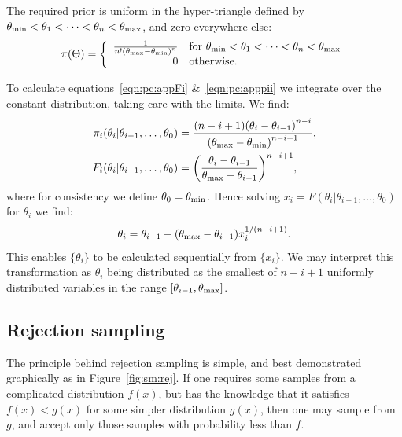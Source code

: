 The required prior is uniform in the hyper-triangle defined by \(\theta_{\mathrm{min}}<\theta_1<\cdots<\theta_n<\theta_{\mathrm{max}}\), and zero everywhere else:
%
\begin{equation}
  \pi(\Theta) = 
  \left\{
    \begin{array}{rl}
      \frac{1}{n!{(\theta_{\mathrm{max}} - \theta_{\mathrm{min}})}^{n}} 
      &
      \text{for }\theta_{\mathrm{min}}<\theta_1<\cdots<\theta_n<\theta_{\mathrm{max}} \\
      0 &\text{otherwise.}
    \end{array}
    \right.
\label{eqn:pc:sorted_uniform_prior}
\end{equation}

To calculate equations~\eqref{eqn:pc:appFi} \&~\eqref{eqn:pc:apppii} we integrate over the constant distribution, taking care with the limits. We find:
\begin{align}
  \pi_i(\theta_i|\theta_{i-1},\ldots,\theta_0) &= \frac{(n-i+1){(\theta_i-\theta_{i-1})}^{n-i}}{{(\theta_{\mathrm{max}}-\theta_{\mathrm{min}})}^{n-i+1}},\\
  F_i(\theta_i|\theta_{i-1},\ldots,\theta_0) &= {\left(\frac{\theta_i-\theta_{i-1}}{\theta_{\mathrm{max}}-\theta_{i-1}}\right)}^{n-i+1},
  \label{eqn:pc:sorted_uniform_calc}
\end{align}
where for consistency we define \(\theta_0 = \theta_{\mathrm{min}}\). Hence solving \(x_i=F(\theta_i|\theta_{i-1},\ldots,\theta_0)\) for \(\theta_i\) we find:
\begin{equation}
  \theta_i = \theta_{i-1}+ (\theta_{\mathrm{max}}-\theta_{i-1})x_i^{1/(n-i+1)}.
  \label{eqn:pc:sorted_uniform_trans}
\end{equation}
This enables \(\{\theta_i\}\) to be calculated sequentially from \(\{x_i\}\). We may interpret this transformation as \(\theta_i\) being distributed as the smallest of \(n-i+1\) uniformly distributed variables in the range \([\theta_{i-1},\theta_{\mathrm{max}}]\).



\subsection{Rejection sampling}
\label{sec:sm:rejection}

The principle behind rejection sampling is simple, and best demonstrated graphically as in Figure~\ref{fig:sm:rej}. If one requires some samples from a complicated distribution \(f(x)\), but has the knowledge that it satisfies \(f(x)<g(x)\) for some simpler distribution \(g(x)\), then one may sample from \(g\), and accept only those samples with probability less than \(f\). 

